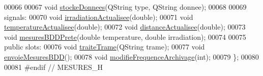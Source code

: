 \begin{DoxyCode}
00066 
00067         \textcolor{keywordtype}{void} \hyperlink{class_mesures_a77652c2332a9234bf08b463d1d389aa5}{stockeDonnees}(QString type, QString donnee); 
00068 
00069     signals:
00070         \textcolor{keywordtype}{void} \hyperlink{class_mesures_a8a6e4db8850930d8e4e96c98d5aa95b8}{irradiationActualisee}(\textcolor{keywordtype}{double}); 
00071         \textcolor{keywordtype}{void} \hyperlink{class_mesures_ab13d5e64ff21fd869fe347ec1c5a246f}{temperatureActualisee}(\textcolor{keywordtype}{double}); 
00072         \textcolor{keywordtype}{void} \hyperlink{class_mesures_a6073f147fb08d7c5cc2ce1c9880becbe}{distanceActualisee}(\textcolor{keywordtype}{double});    
00073         \textcolor{keywordtype}{void} \hyperlink{class_mesures_a97d8dbd7742519d1f3ce959661d8aede}{mesuresBDDPrete}(\textcolor{keywordtype}{double} temperature, \textcolor{keywordtype}{double} irradiation); 
00074 
00075     \textcolor{keyword}{public} slots:
00076         \textcolor{keywordtype}{void} \hyperlink{class_mesures_a43b121b67418802b3332b195d8541481}{traiteTrame}(QString trame);     
00077         \textcolor{keywordtype}{void} \hyperlink{class_mesures_a9eb8d49c9f60b3801110a5c3d0c50149}{envoieMesuresBDD}();             
00078         \textcolor{keywordtype}{void} \hyperlink{class_mesures_ac1d2ea97f648264ebd690fba8f7020cc}{modifieFrequenceArchivage}(\textcolor{keywordtype}{int}); 
00079 \};
00080 
00081 \textcolor{preprocessor}{#endif // MESURES\_H}
\end{DoxyCode}
